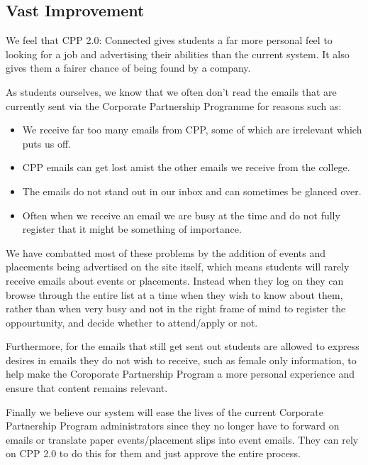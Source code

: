 \subsection{Vast Improvement}
We feel that CPP 2.0: Connected gives students a far more personal feel to looking for a job and advertising their abilities than the current system. It also gives them a fairer chance of being found by a company.

As students ourselves, we know that we often don't read the emails that are currently sent via the Corporate Partnership Programme for reasons such as:
\begin{itemize}
  \item We receive far too many emails from CPP, some of which are irrelevant which puts us off.
  \item CPP emails can get lost amist the other emails we receive from the college.
  \item The emails do not stand out in our inbox and can sometimes be glanced over.
  \item Often when we receive an email we are busy at the time and do not fully register that it might be something of importance.
\end{itemize} 

We have combatted most of these problems by the addition of events and placements being advertised on the site itself, which means students will rarely receive emails about events or placements. Instead when they log on they can browse through the entire list at a time when they wish to know about them, rather than when very busy and not in the right frame of mind to register the oppourtunity, and decide whether to attend/apply or not.

Furthermore, for the emails that still get sent out students are allowed to express desires in emails they do not wish to receive, such as female only information, to help make the Coroporate Partnership Program a more personal experience and ensure that content remains relevant. 

Finally we believe our system will ease the lives of the current Corporate Partnership Program administrators since they no longer have to forward on emails or translate paper events/placement slips into event emails. They can rely on CPP 2.0 to do this for them and just approve the entire process.
